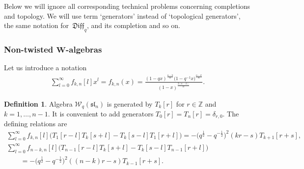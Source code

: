 \documentclass[pdftex]{sigma}
\numberwithin{equation}{section}
\theoremstyle{definition}
\newtheorem{Definition}[Theorem]{Definition}
\newcommand{\half}{\frac{1}{2}}
\newcommand{\qD}{\mathfrak{Diff}_q}
\newcommand{ \W }{ \mathcal{W}_{q} ( \mathfrak{sl}_n ) }
\begin{document}
Below we will ignore all corresponding technical problems concerning completions and topo\-logy. We will use term `generators' instead of `topological generators', the same notation for~$\qD$, and its completion and so on.

\subsubsection[Non-twisted $W$-algebras]{Non-twisted $\boldsymbol{W}$-algebras}
Let us introduce a notation
\begin{gather*}
\sum_{l=0}^{\infty}f_{k,n}[l] x^{l} = f_{k, n} (x)= \frac{ (1-qx)^{\frac{n-k}{n}} \big(1-q^{-1}x\big)^{ \frac{n-k}{n}
}}{(1-x)^{\frac{2(n-k)}{n}}}.
\end{gather*}


\begin{Definition} \label{def: non-twisted W}
Algebra $\W$ is generated by $T_k[r]$ for $r \in \mathbb{Z}$ and $k= 1, \dots, n-1$. It is convenient to add generators $T_0[r]=T_n[r] = \delta_{r,0}$. The defining relations are
\begin{gather}
\sum_{l=0}^{\infty} f_{k,n}[l] \big( T_1[r{-}l] T_k[s{+}l] - T_k[s{-}l] T_1[r{+}l] \big) = -\big(q^{\half}{-}q^{-\half}\big)^2 (kr-s) T_{k+1}[r{+}s], \label{relation:modesW1} \\
\sum_{l=0}^{\infty} f_{n{-}k,n}[l] \big( T_{n{-}1} [r{-}l] T_k[s{+}l] - T_k[s{-}l] T_{n{-}1}[r{+}l] \big) \nonumber\\
\qquad{} = -\big(q^{\half}{-}q^{-\half}\big)^2 ((n{-}k)r-s ) T_{k-1}[r{+}s] .\label{relation:modesWn-1}
\end{gather}
\end{Definition}
\end{document}
